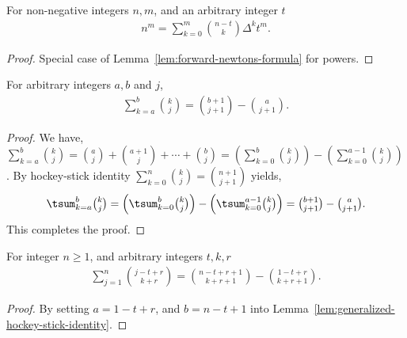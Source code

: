 \begin{lemma}
  \label{lem:forward-newtons-formula-for-powers}
  For non-negative integers $n,m$, and an arbitrary integer $t$
  \begin{align*}
    n^m = \sum_{k=0}^{m} \binom{n-t}{k} \Delta^{k} t^m.
  \end{align*}
  \begin{proof}
    Special case of Lemma~\eqref{lem:forward-newtons-formula} for powers.
  \end{proof}
\end{lemma}

\begin{lemma}
  \label{lem:generalized-hockey-stick-identity}
  For arbitrary integers $a,b$ and $j$,
  \begin{align*}
    \sum_{k=a}^{b} \binom{k}{j} = \binom{b+1}{j+1} - \binom{a}{j+1}.
  \end{align*}
  \begin{proof}
    We have,
    $\sum_{k=a}^{b} \binom{k}{j}
    = \binom{a}{j} + \binom{a+1}{j} + \cdots + \binom{b}{j}
    = \left( \sum_{k=0}^{b} \binom{k}{j} \right) - \left( \sum_{k=0}^{a-1} \binom{k}{j} \right)$.
    By hockey-stick identity $\sum_{k=0}^{n} \binom{k}{j} = \binom{n+1}{j+1}$ yields,
    \begin{align*}
      \tsum_{k=a}^{b} \tbinom{k}{j}
      = \left( \tsum_{k=0}^{b} \tbinom{k}{j} \right) - \left( \tsum_{k=0}^{a-1} \tbinom{k}{j} \right)
      = \tbinom{b+1}{j+1} - \tbinom{a}{j+1}.
    \end{align*}
    This completes the proof.
  \end{proof}
\end{lemma}

\begin{lemma}
  \label{lem:forward-hockey-stick-identity}
  For integer $n\geq1$, and arbitrary integers $t,k,r$
  \begin{align*}
    \sum_{j=1}^{n} \binom{j-t+r}{k+r}
    = \binom{n-t+r+1}{k+r+1} - \binom{1-t+r}{k+r+1}.
  \end{align*}
  \begin{proof}
    By setting $a=1-t+r$, and $b=n-t+1$
    into Lemma~\eqref{lem:generalized-hockey-stick-identity}.
  \end{proof}
\end{lemma}

